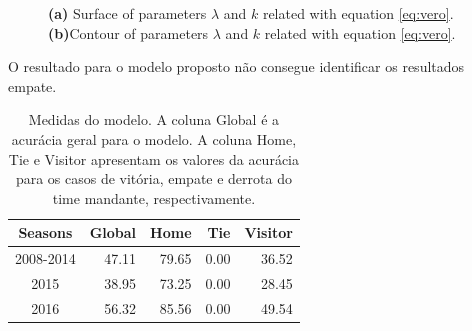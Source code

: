 \documentclass[doc,apacite,oneside,a4paper,12pt]{apa6}
\begin{document}
\begin{figure}%
    \centering
    \qquad
    \caption[\scriptsize{Tunning parameters.}]{\scriptsize{ \textbf{(a)} Surface of parameters $\lambda$ and $k$ related with equation \ref{eq:vero}.\textbf{(b)}Contour of parameters $\lambda$ and $k$ related with equation \ref{eq:vero}.}}
    \label{fig:tunning}%
\end{figure}


O resultado para o modelo proposto não consegue identificar os resultados empate.

\begin{table}[ht]
\centering
\begin{tabular}{crrrr}
  \hline
Seasons & Global & Home & Tie & Visitor \\ 
  \hline
2008-2014 & 47.11 & 79.65 & 0.00 & 36.52 \\ 
  2015 & 38.95 & 73.25 & 0.00 & 28.45 \\ 
  2016 & 56.32 & 85.56 & 0.00 & 49.54 \\ 
   \hline
\end{tabular}
    \caption[\scriptsize{Medidas do modelo.}]{\scriptsize{Medidas do modelo. A coluna Global é a acurácia geral para o modelo. A coluna Home, Tie e Visitor apresentam os valores da acurácia para os casos de vitória, empate e derrota do time mandante, respectivamente.}}
    \label{tab:medidasmod}
\end{table}
\end{document}
